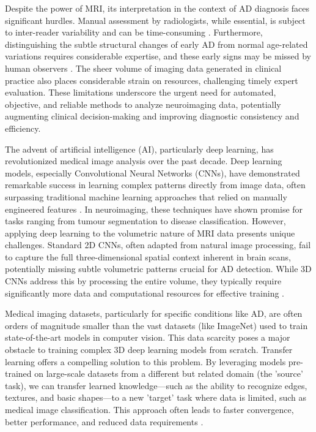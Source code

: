 \documentclass[11pt, a4paper]{article}
\begin{document}
Despite the power of MRI, its interpretation in the context of AD diagnosis faces significant hurdles. Manual assessment by radiologists, while essential, is subject to inter-reader variability and can be time-consuming \cite{cuingnet2011automatic}. Furthermore, distinguishing the subtle structural changes of early AD from normal age-related variations requires considerable expertise, and these early signs may be missed by human observers \cite{kloppel2008accuracy}. The sheer volume of imaging data generated in clinical practice also places considerable strain on resources, challenging timely expert evaluation. These limitations underscore the urgent need for automated, objective, and reliable methods to analyze neuroimaging data, potentially augmenting clinical decision-making and improving diagnostic consistency and efficiency.

The advent of artificial intelligence (AI), particularly deep learning, has revolutionized medical image analysis over the past decade. Deep learning models, especially Convolutional Neural Networks (CNNs), have demonstrated remarkable success in learning complex patterns directly from image data, often surpassing traditional machine learning approaches that relied on manually engineered features \cite{litjens2017survey}. In neuroimaging, these techniques have shown promise for tasks ranging from tumour segmentation to disease classification. However, applying deep learning to the volumetric nature of MRI data presents unique challenges. Standard 2D CNNs, often adapted from natural image processing, fail to capture the full three-dimensional spatial context inherent in brain scans, potentially missing subtle volumetric patterns crucial for AD detection. While 3D CNNs address this by processing the entire volume, they typically require significantly more data and computational resources for effective training \cite{yang2021reinventing}.

Medical imaging datasets, particularly for specific conditions like AD, are often orders of magnitude smaller than the vast datasets (like ImageNet) used to train state-of-the-art models in computer vision. This data scarcity poses a major obstacle to training complex 3D deep learning models from scratch. Transfer learning offers a compelling solution to this problem. By leveraging models pre-trained on large-scale datasets from a different but related domain (the 'source' task), we can transfer learned knowledge—such as the ability to recognize edges, textures, and basic shapes—to a new 'target' task where data is limited, such as medical image classification. This approach often leads to faster convergence, better performance, and reduced data requirements \cite{maqsood2019transfer}.
\end{document}
